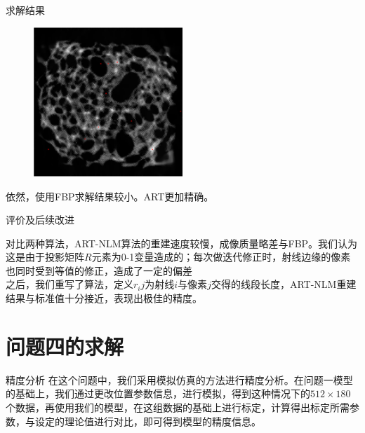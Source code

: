 \documentclass{beamer}
\begin{document}
\begin{frame}{求解结果}
	\begin{figure}[H]
		\centering
		\includegraphics[width=0.5\textwidth]{./pic/res3.png}\\
	\end{figure}
	\small 依然，使用FBP求解结果较小。ART更加精确。  
\end{frame}
  
  
  
\begin{frame}{评价及后续改进}
	  
	对比两种算法，ART-NLM算法的重建速度较慢，成像质量略差与FBP。我们认为这是由于投影矩阵$R$元素为0-1变量造成的；每次做迭代修正时，射线边缘的像素也同时受到等值的修正，造成了一定的偏差\\
	  
	之后，我们重写了算法，定义\(r_ij\)为射线$i$与像素$j$交得的线段长度，ART-NLM重建结果与标准值十分接近，表现出极佳的精度。
	  
\end{frame}
\section{问题四的求解}
\begin{frame}{精度分析}
	在这个问题中，我们采用模拟仿真的方法进行精度分析。在问题一模型的基础上，我们通过更改位置参数信息，进行模拟，得到这种情况下的\(512\times180\)个数据，再使用我们的模型，在这组数据的基础上进行标定，计算得出标定所需参数，与设定的理论值进行对比，即可得到模型的精度信息。
\end{frame}
\end{document}

